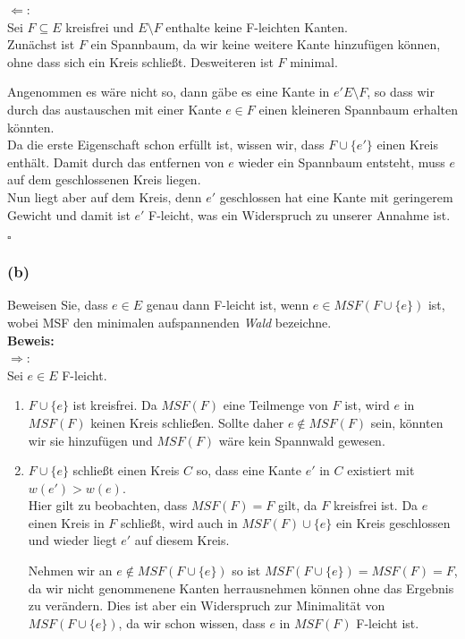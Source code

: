 \documentclass[11pt,a4paper,ngerman]{article}
\begin{document}
$\Leftarrow$:\\
    Sei $F \subseteq E$ kreisfrei und $E \setminus F$ enthalte keine F-leichten Kanten.\\
    
    Zunächst ist $F$ ein Spannbaum, da wir keine weitere Kante hinzufügen können, ohne dass sich ein Kreis schließt.
    Desweiteren ist $F$ minimal.

    Angenommen es wäre nicht so, dann gäbe es eine Kante in $e' E \setminus F$, so dass wir durch das austauschen mit
    einer Kante $e \in F$ einen kleineren Spannbaum erhalten könnten.\\
    
    Da die erste Eigenschaft schon erfüllt ist, wissen wir, dass $F \cup \{ e' \}$ einen Kreis enthält. Damit
    durch das entfernen von $e$ wieder ein Spannbaum entsteht, muss $e$ auf dem geschlossenen Kreis liegen.\\

    Nun liegt aber auf dem Kreis, denn $e'$ geschlossen hat eine Kante mit geringerem Gewicht und damit ist $e'$ F-leicht,
    was ein Widerspruch zu unserer Annahme ist.

    \mbox{} \hfill $\square$

\subsubsection*{(b)}

Beweisen Sie, dass $e\in E$ genau dann F-leicht ist, wenn $e \in MSF(F \cup \{ e\})$ ist, wobei MSF den minimalen aufspannenden \emph{Wald} bezeichne.\\

\textbf{Beweis:}\\

$\Rightarrow$:\\
    Sei $e \in E$ F-leicht. 
    \begin{enumerate}[(1)]
        \item $F \cup \{ e \}$ ist kreisfrei. Da $MSF(F)$ eine Teilmenge von $F$ ist, wird $e$ in $MSF(F)$ keinen Kreis schließen.
            Sollte daher $e \not\in MSF(F)$ sein, könnten wir sie hinzufügen und $MSF(F)$ wäre kein Spannwald gewesen.
        \item $F \cup \{ e \}$ schließt einen Kreis $C$ so, dass eine Kante $e'$ in $C$ existiert mit $w(e') > w(e)$.\\
            Hier gilt zu beobachten, dass $MSF(F) = F$ gilt, da $F$ kreisfrei ist. Da $e$ einen Kreis in $F$ schließt,
            wird auch in $MSF(F) \cup \{ e \}$ ein Kreis geschlossen und wieder liegt $e'$ auf diesem Kreis.

            Nehmen wir an $e \not\in MSF(F \cup \{ e \})$ so ist $MSF(F \cup \{ e \}) = MSF(F) = F$, da wir nicht genommenene
            Kanten herrausnehmen können ohne das Ergebnis zu verändern. Dies ist aber ein Widerspruch zur Minimalität von $MSF(F \cup \{ e \})$,
            da wir schon wissen, dass $e$ in $MSF(F)$ F-leicht ist.
    \end{enumerate}
\end{document}
